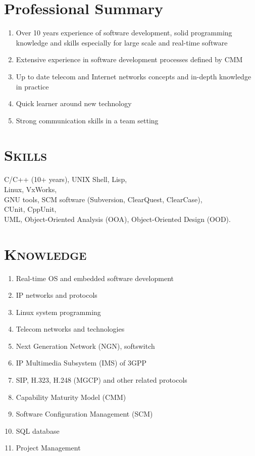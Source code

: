 \documentclass[margin,11pt]{res}
\begin{document}
\begin{resume}
 
\section{Professional Summary}

\begin{enumerate}
    \item Over 10 years experience of software development, solid programming knowledge and
      skills especially for large scale and real-time software
    \item Extensive experience in software development processes defined by CMM
    \item Up to date telecom and Internet networks concepts and in-depth knowledge in practice
    \item Quick learner around new technology
    \item Strong communication skills in a team setting
\end{enumerate}

\section{\textsc{Skills}} 
   C/C++ (10+ years), UNIX Shell, Lisp, \\
   Linux, VxWorks, \\
   GNU tools, SCM software (Subversion, ClearQuest, ClearCase),\\
   CUnit, CppUnit, \\
   UML, Object-Oriented Analysis (OOA), Object-Oriented Design (OOD).

\section{\textsc{Knowledge}} 
\begin{enumerate}
    \item Real-time OS and embedded software development
    \item IP networks and protocols
    \item Linux system programming
    \item Telecom networks and technologies
    \item Next Generation Network (NGN), softswitch
    \item IP Multimedia Subsystem (IMS) of 3GPP
    \item SIP, H.323, H.248 (MGCP) and other related protocols
    \item Capability Maturity Model (CMM)
    \item Software Configuration Management (SCM)
    \item SQL database
    \item Project Management
\end{enumerate}
 

\end{resume}
\end{document}
